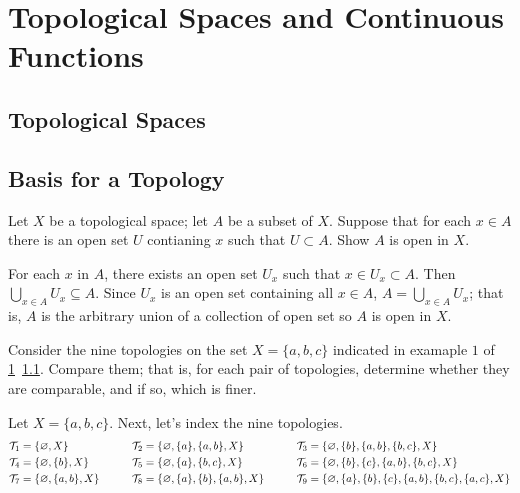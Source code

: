 \chapter{Topological Spaces and Continuous Functions}
\label{ch2}

\section{Topological Spaces}
\label{ch2sec1}

\section{Basis for a Topology}

\begin{exercise}
\item
  Let \(X\) be a topological space; let \(A\) be a subset of \(X\).
  Suppose that for each \(x\in A\) there is an open set \(U\) contianing \(x\)
  such that \(U\subset A\).
  Show \(A\) is open in \(X\).
  \par\smallskip
  For each \(x\) in \(A\), there exists an open set \(U_x\) such that
  \(x\in U_x\subset A\).
  Then \(\bigcup_{x\in A}U_x\subseteq A\).
  Since \(U_x\) is an open set containing all \(x\in A\),
  \(A = \bigcup_{x\in A}U_x\); that is, \(A\) is the arbitrary union of a
  collection of open set so \(A\) is open in \(X\).
\item
  Consider the nine topologies on the set \(X = \{a,b,c\}\) indicated in
  examaple \(1\) of \cref{ch2}~\cref{ch2sec1}.
  Compare them; that is, for each pair of topologies, determine whether they
  are comparable, and if so, which is finer.
  \par\smallskip
  Let \(X = \{a,b,c\}\).
  Next, let's index the nine topologies.
  \begin{align*}
    \mathcal{T}_1 & = \{\varnothing, X\}
    & \qquad \mathcal{T}_2 & = \{\varnothing, \{a\}, \{a, b\}, X\}
    & \qquad \mathcal{T}_3 & = \{\varnothing, \{b\}, \{a, b\}, \{b, c\}, X\}\\
    \mathcal{T}_4 & = \{\varnothing, \{b\}, X\}
    & \qquad \mathcal{T}_5 & = \{\varnothing, \{a\}, \{b, c\}, X\}
    & \qquad\mathcal{T}_6 & = \{\varnothing, \{b\}, \{c\}, \{a, b\}, \{b, c\}, X\}\\
    \mathcal{T}_7 & = \{\varnothing, \{a, b\}, X\}
    & \qquad \mathcal{T}_8 & = \{\varnothing, \{a\}, \{b\}, \{a, b\}, X\}
    & \qquad \mathcal{T}_9 & = \{\varnothing, \{a\}, \{b\}, \{c\}, \{a, b\},
                      \{b, c\}, \{a, c\}, X\}
  \end{align*}

\end{exercise}
